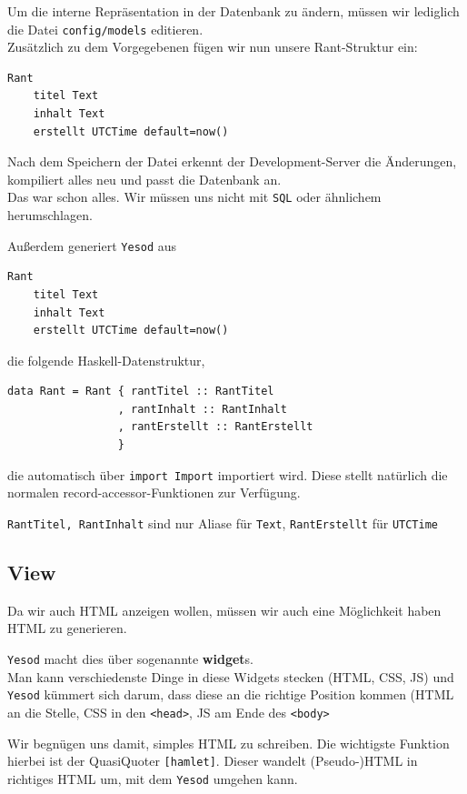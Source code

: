 \documentclass{beamer}
\begin{document}
\begin{frame}[fragile]
Um die interne Repräsentation in der Datenbank zu ändern, müssen wir lediglich die Datei \texttt{config/models} editieren. \\\pause
Zusätzlich zu dem Vorgegebenen fügen wir nun unsere Rant-Struktur ein:
\begin{verbatim}
Rant
    titel Text
    inhalt Text
    erstellt UTCTime default=now()
\end{verbatim}
\pause
Nach dem Speichern der Datei erkennt der Development-Server die Änderungen, kompiliert alles neu und passt die Datenbank an.\\\pause
Das war schon alles. Wir müssen uns nicht mit \texttt{SQL} oder ähnlichem herumschlagen.
\end{frame}

\begin{frame}[fragile]
Außerdem generiert \texttt{Yesod} aus
\begin{verbatim}
Rant
    titel Text
    inhalt Text
    erstellt UTCTime default=now()
\end{verbatim}
\pause
die folgende Haskell-Datenstruktur,
\begin{verbatim}
data Rant = Rant { rantTitel :: RantTitel
                 , rantInhalt :: RantInhalt
                 , rantErstellt :: RantErstellt
                 }
\end{verbatim}
\pause
die automatisch über \texttt{import Import} importiert wird. Diese stellt natürlich die normalen record-accessor-Funktionen zur Verfügung.\\\par\pause
\texttt{RantTitel, RantInhalt} sind nur Aliase für \texttt{Text}, \texttt{RantErstellt} für \texttt{UTCTime}
\end{frame}

\subsection{View}

\begin{frame}[fragile]
Da wir auch HTML anzeigen wollen, müssen wir auch eine Möglichkeit haben HTML zu generieren.\\\pause\par
\texttt{Yesod} macht dies über sogenannte \textbf{widget}s. \\\pause
Man kann verschiedenste Dinge in diese Widgets stecken (HTML, CSS, JS) und \texttt{Yesod} kümmert sich darum, dass diese an die richtige Position kommen (HTML an die Stelle, CSS in den \texttt{<head>}, JS am Ende des \texttt{<body>}\\\par
\pause
Wir begnügen uns damit, simples HTML zu schreiben. Die wichtigste Funktion hierbei ist der QuasiQuoter \texttt{[hamlet]}. Dieser wandelt (Pseudo-)HTML in richtiges HTML um, mit dem \texttt{Yesod} umgehen kann.
\end{frame}
\end{document}
